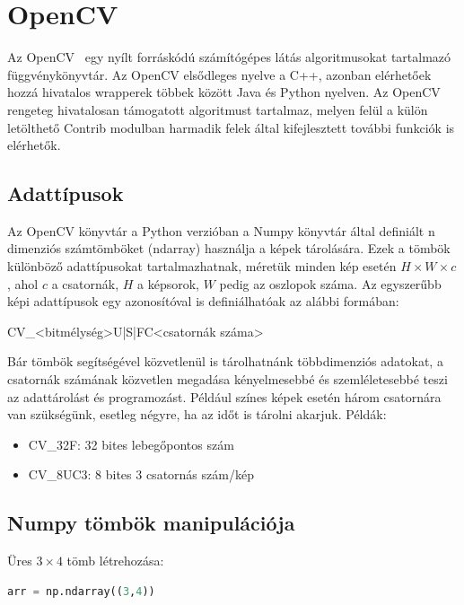 \documentclass[12pt,a4paper,oneside]{report}             %
\begin{document}
\section{OpenCV}

Az OpenCV~\cite{opencv} egy nyílt forráskódú számítógépes látás algoritmusokat tartalmazó függvénykönyvtár. Az OpenCV elsődleges nyelve a C++, azonban elérhetőek hozzá hivatalos wrapperek többek között Java és Python nyelven. Az OpenCV rengeteg hivatalosan támogatott algoritmust tartalmaz, melyen felül a külön letölthető Contrib modulban harmadik felek által kifejlesztett további funkciók is elérhetők.

\subsection{Adattípusok}

Az OpenCV könyvtár a Python verzióban a Numpy könyvtár által definiált n dimenziós számtömböket (ndarray) használja a képek tárolására. Ezek a tömbök különböző adattípusokat tartalmazhatnak, méretük minden kép esetén $H\times W\times c$, ahol $c$ a csatornák, $H$ a képsorok, $W$ pedig az oszlopok száma. Az egyszerűbb képi adattípusok egy azonosítóval is definiálhatóak az alábbi formában:

\begin{center} 
	CV\_<bitmélység>{U|S|F}C<csatornák száma>
\end{center} 

Bár tömbök segítségével közvetlenül is tárolhatnánk többdimenziós adatokat, a csatornák számának közvetlen megadása kényelmesebbé és szemléletesebbé teszi az adattárolást és programozást. Például színes képek esetén három csatornára van szükségünk, esetleg négyre, ha az időt is tárolni akarjuk.
Példák:
\begin{itemize}
	\item CV\_32F: 32 bites lebegőpontos szám
	\item CV\_8UC3: 8 bites 3 csatornás szám/kép
\end{itemize}

\subsection{Numpy tömbök manipulációja}

Üres $3\times 4$ tömb létrehozása:

\begin{lstlisting}[language=Python]
arr = np.ndarray((3,4))
\end{lstlisting}
\end{document}
